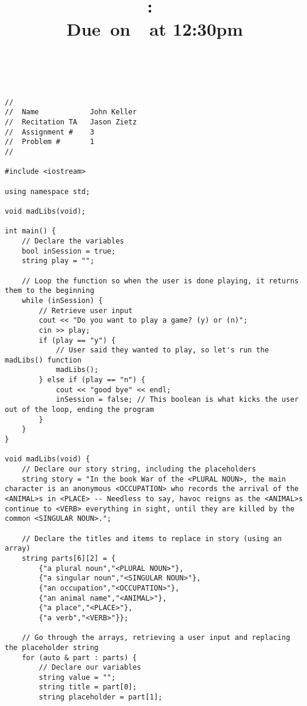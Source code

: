 \documentclass{article}
\title{
    \vspace{2in}
    \textmd{\textbf{\hmwkClass:\ \hmwkTitle}}\\
    \normalsize\vspace{0.1in}\small{Due\ on\ \hmwkDueDate\ at 12:30pm}\\
    \vspace{0.1in}\large{\textit{\hmwkClassInstructor\ \hmwkClassTime}}
    \vspace{3in}
}
\author{\hmwkAuthorName}
\date{}
\begin{document}


\begin{lstlisting}
//
//  Name            John Keller
//  Recitation TA   Jason Zietz
//  Assignment #    3
//  Problem #       1
//

#include <iostream>

using namespace std;

void madLibs(void);

int main() {
    // Declare the variables
    bool inSession = true;
    string play = "";
    
    // Loop the function so when the user is done playing, it returns them to the beginning
    while (inSession) {
        // Retrieve user input
        cout << "Do you want to play a game? (y) or (n)";
        cin >> play;
        if (play == "y") {
            // User said they wanted to play, so let's run the madLibs() function
            madLibs();
        } else if (play == "n") {
            cout << "good bye" << endl;
            inSession = false; // This boolean is what kicks the user out of the loop, ending the program
        }
    }
}

void madLibs(void) {
    // Declare our story string, including the placeholders
    string story = "In the book War of the <PLURAL NOUN>, the main character is an anonymous <OCCUPATION> who records the arrival of the <ANIMAL>s in <PLACE> -- Needless to say, havoc reigns as the <ANIMAL>s continue to <VERB> everything in sight, until they are killed by the common <SINGULAR NOUN>.";

    // Declare the titles and items to replace in story (using an array)
    string parts[6][2] = {
        {"a plural noun","<PLURAL NOUN>"},
        {"a singular noun","<SINGULAR NOUN>"},
        {"an occupation","<OCCUPATION>"},
        {"an animal name","<ANIMAL>"},
        {"a place","<PLACE>"},
        {"a verb","<VERB>"}};
    
    // Go through the arrays, retrieving a user input and replacing the placeholder string
    for (auto & part : parts) {
        // Declare our variables
        string value = "";
        string title = part[0];
        string placeholder = part[1];
        

\end{lstlisting}
\end{document}
